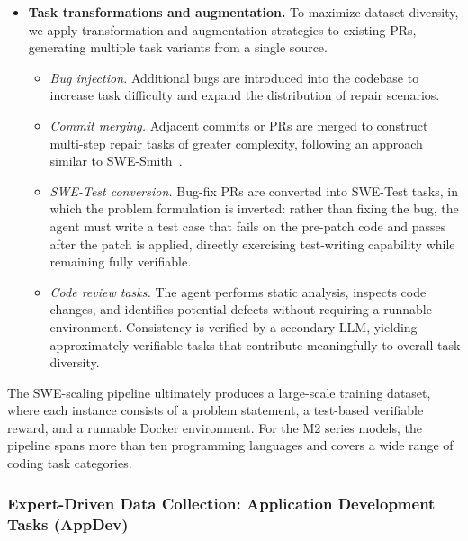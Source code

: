\begin{itemize}
    \item \textbf{Task transformations and augmentation.} To maximize dataset diversity, we apply transformation and augmentation strategies to existing PRs, generating multiple task variants from a single source.
    \begin{itemize}
        \item \textit{Bug injection.} Additional bugs are introduced into the codebase to increase task difficulty and expand the distribution of repair scenarios.
        \item \textit{Commit merging.} Adjacent commits or PRs are merged to construct multi-step repair tasks of greater complexity, following an approach similar to SWE-Smith~\citep{yang2024swesmith}.
        \item \textit{SWE-Test conversion.} Bug-fix PRs are converted into SWE-Test tasks, in which the problem formulation is inverted: rather than fixing the bug, the agent must write a test case that fails on the pre-patch code and passes after the patch is applied, directly exercising test-writing capability while remaining fully verifiable.
        \item \textit{Code review tasks.} The agent performs static analysis, inspects code changes, and identifies potential defects without requiring a runnable environment. Consistency is verified by a secondary LLM, yielding approximately verifiable tasks that contribute meaningfully to overall task diversity.
    \end{itemize}
\end{itemize}

The SWE-scaling pipeline ultimately produces a large-scale training dataset, where each instance consists of a problem statement, a test-based verifiable reward, and a runnable Docker environment. For the M2 series models, the pipeline spans more than ten programming languages and covers a wide range of coding task categories.

\subsubsection{Expert-Driven Data Collection: Application Development Tasks (AppDev)}

